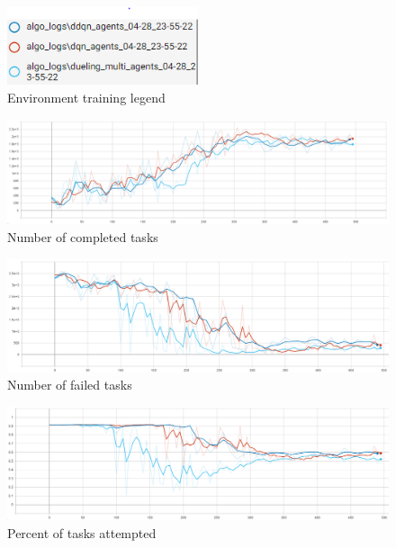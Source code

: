 \begin{figure}
    \includegraphics[width=0.5\textwidth]{figures/4_test_eval_figs/algo_training_fig/legend.PNG}
    \caption{Environment training legend}
    \label{fig:algo-training-legend}
\end{figure}

\begin{figure}[H]
    \centering
    \includegraphics[width=17cm]{figures/4_test_eval_figs/algo_training_fig/num_completed_tasks.PNG}
    \caption{Number of completed tasks}
    \label{fig:algo_num_completed_tasks}
\end{figure}

\begin{figure}[H]
    \centering
    \includegraphics[width=17cm]{figures/4_test_eval_figs/algo_training_fig/num_failed_tasks.png}
    \caption{Number of failed tasks}
    \label{fig:algo_num_failed_tasks}
\end{figure}

\begin{figure}[H]
    \centering
    \includegraphics[width=17cm]{figures/4_test_eval_figs/algo_training_fig/percent_tasks.png}
    \caption{Percent of tasks attempted}
    \label{fig:algo_percent_tasks}
\end{figure}

